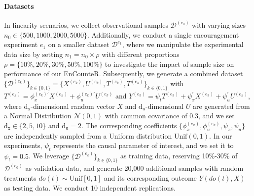 \documentclass[journal]{IEEEtran}
\begin{document}
\paragraph{Datasets} 
In linearity scenarios, we collect observational samples $\mathcal{D}^{(e_0)}$ with varying sizes $n_0 \in \{500,1000,2000,5000\}$. Additionally, we conduct a single encouragement experiment $e_1$ on a smaller dataset $\mathcal{D}^{e_1}$, where we manipulate the experimental data size by setting $n_1=n_0 \times \rho$ with different proportions $\rho = \{10\%,20\%,30\%,50\%,100\%\}$ to investigate the impact of sample size on performance of our EnCounteR. Subsequently, we generate a combined dataset $\{\mathcal{D}^{(e_k)}\}_{k \in \{0,1\}} = \{X^{(e_k)}, U^{(e_k)}, T^{(e_k)}, T^{(e_k)}\}_{k \in \{0,1\}}$ with $T^{(e_k)} = \phi_{x}^{(e_k)\prime} X^{(e_k)} +\phi_{u}^{(e_k)\prime} U^{(e_k)}$ and $Y^{(e_k)} = \psi_t T^{(e_k)} + \psi_{x}^\prime X^{(e_k)} +\psi_{u}^\prime U^{(e_k)}$,
where $\text{d}_\text{x}$-dimensional random vector $X$ and $\text{d}_u$-dimensional $U$ are generated from a Normal Distribution $\mathcal{N}(0,1)$ with common covariance of 0.3, and we set $\text{d}_\text{x} \in \{2,5,10\}$ and $\text{d}_\text{u} = 2$. The corresponding coefficients $\{\phi_{x}^{(e_k)}, \phi_{u}^{(e_k)}, \psi_{x}, \psi_{u}\}$ are independently sampled from a Uniform distribution $\text{Unif}(0,1)$. In our experiments, $\psi_t$ represents the causal parameter of interest, and we set it to $\psi_t=0.5$. We leverage $\{\mathcal{D}^{(e_k)}\}_{k \in \{0,1\}}$ as training data, reserving 10\%-30\% of $\mathcal{D}^{(e_0)}$ as validation data, and generate 20,000 additional samples with random treatments $do(t) \sim \text{Unif}[0, 1]$ and its corresponding outcome $Y(do(t),X)$ as testing data. 
We conduct 10 independent replications.
\end{document}
